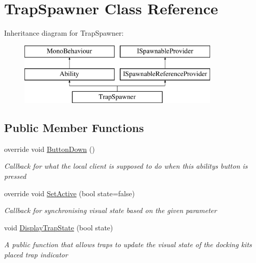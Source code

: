\hypertarget{class_trap_spawner}{}\section{Trap\+Spawner Class Reference}
\label{class_trap_spawner}
Inheritance diagram for Trap\+Spawner\+:\begin{figure}[H]
\begin{center}
\leavevmode
\includegraphics[height=3.000000cm]{class_trap_spawner}
\end{center}
\end{figure}
\subsection*{Public Member Functions}
\begin{DoxyCompactItemize}
\item 
override void \hyperlink{class_trap_spawner_ac214a69bf4c841b0c74bb159ceb912b9}{Button\+Down} ()
\begin{DoxyCompactList}\small\item\em Callback for what the local client is supposed to do when this ability\textquotesingle{}s button is pressed \end{DoxyCompactList}\item 
override void \hyperlink{class_trap_spawner_af9de8164ae685cef7e8f4349384f5e45}{Set\+Active} (bool state=false)
\begin{DoxyCompactList}\small\item\em Callback for synchronising visual state based on the given parameter \end{DoxyCompactList}\item 
void \hyperlink{class_trap_spawner_a3ea9d0db92caae6b1a70903fbdfda3cf}{Display\+Trap\+State} (bool state)
\begin{DoxyCompactList}\small\item\em A public function that allows traps to update the visual state of the docking kit\textquotesingle{}s placed trap indicator \end{DoxyCompactList}\end{DoxyCompactItemize}
